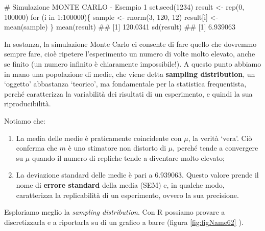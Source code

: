 \documentclass[a4paper,12pt,oneside]{book}
\providecommand{\tightlist}{%
  \setlength{\itemsep}{0pt}\setlength{\parskip}{0pt}}
\newenvironment{Shaded}{\begin{snugshade}}{\end{snugshade}}
\newcommand{\DecValTok}[1]{#1}
\newcommand{\SpecialCharTok}[1]{#1}
\newcommand{\CommentTok}[1]{#1}
\newcommand{\DocumentationTok}[1]{#1}
\newcommand{\OtherTok}[1]{#1}
\newcommand{\FunctionTok}[1]{#1}
\newcommand{\ControlFlowTok}[1]{#1}
\newcommand{\NormalTok}[1]{#1}
\begin{document}
\begin{Shaded}
\begin{Highlighting}[]
\CommentTok{\# Simulazione MONTE CARLO {-} Esempio 1}
\FunctionTok{set.seed}\NormalTok{(}\DecValTok{1234}\NormalTok{)}
\NormalTok{result }\OtherTok{\textless{}{-}} \FunctionTok{rep}\NormalTok{(}\DecValTok{0}\NormalTok{, }\DecValTok{100000}\NormalTok{)}
\ControlFlowTok{for}\NormalTok{ (i }\ControlFlowTok{in} \DecValTok{1}\SpecialCharTok{:}\DecValTok{100000}\NormalTok{)\{}
\NormalTok{  sample }\OtherTok{\textless{}{-}} \FunctionTok{rnorm}\NormalTok{(}\DecValTok{3}\NormalTok{, }\DecValTok{120}\NormalTok{, }\DecValTok{12}\NormalTok{)}
\NormalTok{  result[i] }\OtherTok{\textless{}{-}} \FunctionTok{mean}\NormalTok{(sample)}
\NormalTok{\}}
\FunctionTok{mean}\NormalTok{(result)}
\DocumentationTok{\#\# [1] 120.0341}
\FunctionTok{sd}\NormalTok{(result)}
\DocumentationTok{\#\# [1] 6.939063}
\end{Highlighting}
\end{Shaded}

In sostanza, la simulazione Monte Carlo ci consente di fare quello che dovremmo sempre fare, cioè ripetere l'esperimento un numero di volte molto elevato, anche se finito (un numero infinito è chiaramente impossibile!). A questo punto abbiamo in mano una popolazione di medie, che viene detta \textbf{sampling distribution}, un `oggetto' abbastanza `teorico', ma fondamentale per la statistica frequentista, perché caratterizza la variabilità dei risultati di un esperimento, e quindi la sua riproducibilità.

Notiamo che:

\begin{enumerate}
\def\labelenumi{\arabic{enumi}.}
\tightlist
\item
  La media delle medie è praticamente coincidente con \(\mu\), la verità `vera'. Ciò conferma che \(m\) è uno stimatore non distorto di \(\mu\), perché tende a convergere su \(\mu\) quando il numero di repliche tende a diventare molto elevato;
\item
  La deviazione standard delle medie è pari a 6.939063. Questo valore prende il nome di \textbf{errore standard} della media (SEM) e, in qualche modo, caratterizza la replicabilità di un esperimento, ovvero la sua precisione.
\end{enumerate}

Esploriamo meglio la \emph{sampling distribution}. Con R possiamo provare a discretizzarla e a riportarla su di un grafico a barre (figura \ref{fig:figName62} ).
\end{document}
